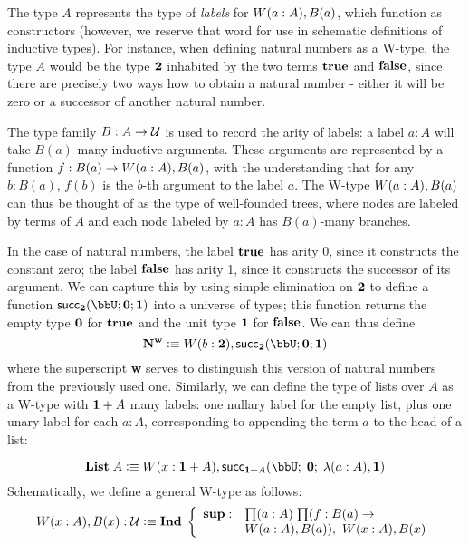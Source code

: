 The type $A$ represents the type of \emph{labels} for $W(a :A), B(a)$, which function as constructors (however, we reserve that word for use in schematic definitions of inductive types). For instance, when defining natural numbers as a W-type, the type $A$ would be the type $\mathbf{2}$ inhabited by the two terms $\mathbf{true}$ and $\mathbf{false}$, since there are precisely two ways how to obtain a natural number - either it will be zero or a successor of another natural number. 

The type family $B : A \to \mathcal{U}$ is used to record the arity of labels: a label $a : A$ will take $B(a)$-many inductive arguments. These arguments are represented by a function $f : B(a) \to W(a :A), B(a)$, with the understanding that for any $b : B(a)$, $f(b)$ is the $b$-th argument to the label $a$. The W-type $W(a :A), B(a)$ can thus be thought of as the type of well-founded trees, where nodes are labeled by terms of $A$ and each node labeled by $a : A$ has $B(a)$-many branches.

In the case of natural numbers, the label $\mathbf{true} $ has arity 0, since it constructs the constant zero; the label $\mathbf{false}$ has arity 1, since it constructs the successor of its argument. We can capture this by using simple elimination on $\mathbf{2}$ to define a function $\rec_\two(\bbU;\zero;\one)$ into a universe of types; this function returns the empty type $\mathbf{0}$ for $\mathbf{true}$ and the unit type $\mathbf{1}$ for $\mathbf{false}$. We can thus define
\[ \natw \defeq \wtype{b:\two} \rec_\two(\bbU;\zero;\one) \]
where the superscript \textbf{w} serves to distinguish this version of natural numbers from the previously used one.
Similarly, we can define the type of lists over $A$ as a W-type with $\mathbf{1} + A$ many labels: one nullary label for the empty list, plus one unary label for each $a : A$, corresponding to appending the term $a$ to the head of a list:

\[ \lst \; A \defeq \wtype{x:\disj{\one}{A}} \rec_{\disj{\one}{A}}(\bbU; \; \zero; \; \lambda{(a:A)}, \one) \]
Schematically, we define a general W-type as follows:
\[ \wtype{x:A} B(x) : \type \defeq \ind \left\{
\begin{array}{ll}
\supp : & \prd{a:A}{f : B(a) \to \\ & \wtype{a:A} B(a)}  \wtype{x:A} B(x)
\end{array}
\right. \]

